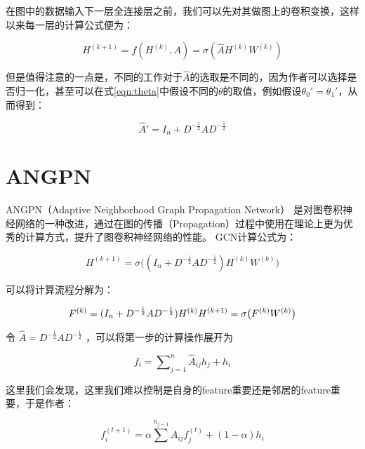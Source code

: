 \documentclass[color=gray,base=hide,cn]{elegantbook}
\begin{document}
在图中的数据输入下一层全连接层之前，我们可以先对其做图上的卷积变换，这样以来每一层的计算公式便为：

\begin{equation}
    {H}^{(k+1)} = f(H^{(k)}, A) = \sigma\left(\hat{A} H^{(k)}W^{(k)}\right)
\end{equation}

但是值得注意的一点是，不同的工作对于$\hat{A}$的选取是不同的，因为作者可以选择是否归一化，甚至可以在式\ref{eqn:theta}中假设不同的$\theta$的取值，例如假设$\theta_0' = \theta_1' $，从而得到：

\begin{equation}
    \hat{A}' = {I_n}+{D}^{-\frac{1}{2}}{A}{D}^{-\frac{1}{2}}
\end{equation}

\section{ANGPN}
ANGPN（Adaptive Neighborhood Graph Propagation Network） \cite{Jiang2019SemisupervisedLW}是对图卷积神经网络的一种改进，通过在图的传播（Propagation）过程中使用在理论上更为优秀的计算方式，提升了图卷积神经网络的性能。
GCN计算公式为：

\begin{equation}
    {H}^{(k+1)} = \sigma\big(({I_n}+{D}^{-\frac{1}{2}}{A}{D}^{-\frac{1}{2}}){H}^{(k)}{W}^{(k)}\big)
\end{equation}

可以将计算流程分解为：

\begin{equation}
    {F}^{(k)} = ({I_n}+{D}^{-\frac{1}{2}}{A}{D}^{-\frac{1}{2}}){H}^{(k)} \\ {H}^{(k+1)} = \sigma\big( {F}^{(k)}  {W}^{(k)}\big)
\end{equation}

令 $\hat{{A}} = {D}^{-\frac{1}{2}}{A}{D}^{-\frac{1}{2}}$ ，可以将第一步的计算操作展开为

\begin{equation}
    {f}_i = \sum\nolimits^n_{j=1}\hat{{A}}_{ij}{h}_j  +{h}_i
\end{equation}

这里我们会发现，这里我们难以控制是自身的feature重要还是邻居的feature重要，于是作者：

\begin{equation}
    {f}_i^{(t+1)} = \alpha \sum^n\nolimits_{j=1}{A}_{ij} {f}_j^{(t)} + (1-\alpha){h}_i
\end{equation}
\end{document}
